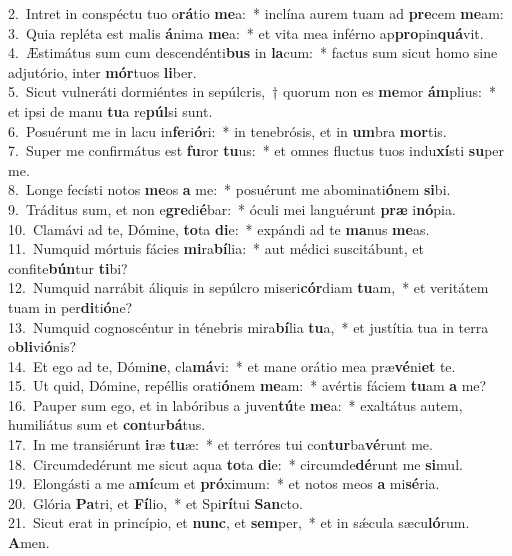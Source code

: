 {2.~}Intret in conspéctu tuo o\textbf{rá}tio \textbf{me}a:~* inclína aurem tuam ad \textbf{pre}cem \textbf{me}am:\\
{3.~}Quia repléta est malis \textbf{á}nima \textbf{me}a:~* et vita mea inférno ap\textbf{pro}pin\textbf{quá}vit.\\
{4.~}Æstimátus sum cum descendénti\textbf{bus} in \textbf{la}cum:~* factus sum sicut homo sine adjutório, inter \textbf{mór}tuos \textbf{li}ber.\\
{5.~}Sicut vulneráti dormiéntes in sepúlcris,~† quorum non es \textbf{me}mor \textbf{ám}plius:~* et ipsi de manu \textbf{tu}a re\textbf{púl}si sunt.\\
{6.~}Posuérunt me in lacu in\textbf{fe}ri\textbf{ó}ri:~* in tenebrósis, et in \textbf{um}bra \textbf{mor}tis.\\
{7.~}Super me confirmátus est \textbf{fu}ror \textbf{tu}us:~* et omnes fluctus tuos indu\textbf{xí}sti \textbf{su}per me.\\
{8.~}Longe fecísti notos \textbf{me}os \textbf{a} me:~* posuérunt me abominati\textbf{ó}nem \textbf{si}bi.\\
{9.~}Tráditus sum, et non e\textbf{gre}di\textbf{é}bar:~* óculi mei languérunt \textbf{præ} i\textbf{nó}pia.\\
{10.~}Clamávi ad te, Dómine, \textbf{to}ta \textbf{di}e:~* expándi ad te \textbf{ma}nus \textbf{me}as.\\
{11.~}Numquid mórtuis fácies \textbf{mi}ra\textbf{bí}lia:~* aut médici suscitábunt, et confite\textbf{bún}tur \textbf{ti}bi?\\
{12.~}Numquid narrábit áliquis in sepúlcro miseri\textbf{cór}diam \textbf{tu}am,~* et veritátem tuam in per\textbf{di}ti\textbf{ó}ne?\\
{13.~}Numquid cognoscéntur in ténebris mira\textbf{bí}lia \textbf{tu}a,~* et justítia tua in terra o\textbf{bli}vi\textbf{ó}nis?\\
{14.~}Et ego ad te, Dómi\textbf{ne}, cla\textbf{má}vi:~* et mane orátio mea præ\textbf{vé}ni\textbf{et} te.\\
{15.~}Ut quid, Dómine, repéllis orati\textbf{ó}nem \textbf{me}am:~* avértis fáciem \textbf{tu}am \textbf{a} me?\\
{16.~}Pauper sum ego, et in labóribus a juven\textbf{tú}te \textbf{me}a:~* exaltátus autem, humiliátus sum et \textbf{con}tur\textbf{bá}tus.\\
{17.~}In me transiérunt \textbf{i}ræ \textbf{tu}æ:~* et terróres tui con\textbf{tur}ba\textbf{vé}runt me.\\
{18.~}Circumdedérunt me sicut aqua \textbf{to}ta \textbf{di}e:~* circumde\textbf{dé}runt me \textbf{si}mul.\\
{19.~}Elongásti a me a\textbf{mí}cum et \textbf{pró}ximum:~* et notos meos \textbf{a} mi\textbf{sé}ria.\\
{20.~}Glória \textbf{Pa}tri, et \textbf{Fí}lio,~* et Spi\textbf{rí}tui \textbf{San}cto.\\
{21.~}Sicut erat in princípio, et \textbf{nunc}, et \textbf{sem}per,~* et in sǽcula sæcu\textbf{ló}rum. \textbf{A}men.\\

